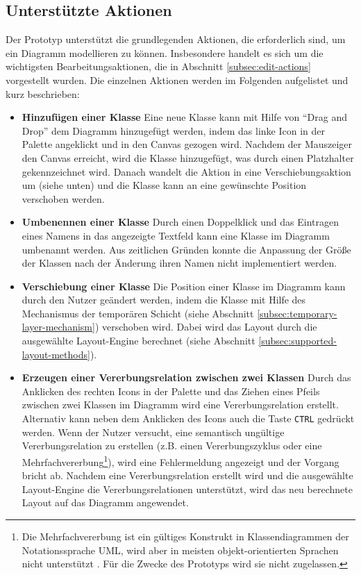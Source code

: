 \subsection{Unterstützte Aktionen}
\label{subsec:supported-actions}

Der Prototyp unterstützt die grundlegenden Aktionen, die erforderlich sind, um ein Diagramm modellieren zu können. Insbesondere handelt es sich um die wichtigsten Bearbeitungsaktionen, die in Abschnitt \ref{subsec:edit-actions} vorgestellt wurden. Die einzelnen Aktionen werden im Folgenden aufgelistet und kurz beschrieben:

\begin{itemize}

\item
\textbf{Hinzufügen einer Klasse}
Eine neue Klasse kann mit Hilfe von \enquote{Drag and Drop} dem Diagramm hinzugefügt werden, indem das linke Icon in der Palette angeklickt und in den Canvas gezogen wird. Nachdem der Mauszeiger den Canvas erreicht, wird die Klasse hinzugefügt, was durch einen Platzhalter gekennzeichnet wird. Danach wandelt die Aktion in eine Verschiebungsaktion um (siehe unten) und die Klasse kann an eine gewünschte Position verschoben werden.

\item
\textbf{Umbenennen einer Klasse}
Durch einen Doppelklick und das Eintragen eines Namens in das angezeigte Textfeld kann eine Klasse im Diagramm umbenannt werden. Aus zeitlichen Gründen konnte die Anpassung der Größe der Klassen nach der Änderung ihren Namen nicht implementiert werden.

\item
\textbf{Verschiebung einer Klasse}
Die Position einer Klasse im Diagramm kann durch den Nutzer geändert werden, indem die Klasse mit Hilfe des Mechanismus der temporären Schicht (siehe Abschnitt \ref{subsec:temporary-layer-mechanism}) verschoben wird. Dabei wird das Layout durch die ausgewählte Layout-Engine berechnet (siehe Abschnitt \ref{subsec:supported-layout-methods}).

\item
\textbf{Erzeugen einer Vererbungsrelation zwischen zwei Klassen}
Durch das Anklicken des rechten Icons in der Palette und das Ziehen eines Pfeils zwischen zwei Klassen im Diagramm wird eine Vererbungsrelation erstellt. Alternativ kann neben dem Anklicken des Icons auch die Taste \texttt{CTRL} gedrückt werden. Wenn der Nutzer versucht, eine semantisch ungültige Vererbungsrelation zu erstellen (z.B. einen Vererbungszyklus oder eine Mehrfachvererbung\footnote{Die Mehrfachvererbung ist ein gültiges Konstrukt in Klassendiagrammen der Notationssprache UML, wird aber in meisten objekt-orientierten Sprachen nicht unterstützt \cite{ArlowNeustadt05UML-2-and-the-Unified}. Für die Zwecke des Prototyps wird sie nicht zugelassen.}), wird eine Fehlermeldung angezeigt und der Vorgang bricht ab. Nachdem eine Vererbungsrelation erstellt wird und die ausgewählte Layout-Engine die Vererbungsrelationen unterstützt, wird das neu berechnete Layout auf das Diagramm angewendet.


\end{itemize}
